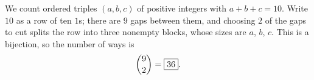 We count ordered triples $(a,b,c)$ of positive integers with $a+b+c=10$. Write $10$ as a row of ten $1$s; there are $9$ gaps between them, and choosing $2$ of the gaps to cut splits the row into three nonempty blocks, whose sizes are $a$, $b$, $c$. This is a bijection, so the number of ways is
\[
\dbinom92=\boxed{36}.
\]
